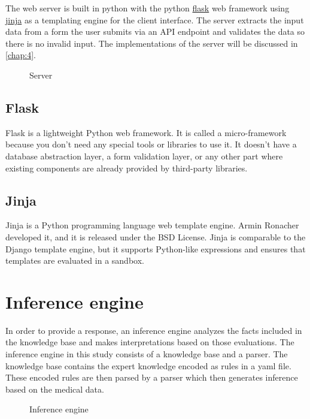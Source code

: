 The web server is built in python with the python \href{https://flask.palletsprojects.com/en/2.1.x/}{flask} web framework using \href{https://jinja.palletsprojects.com/en/3.1.x/}{jinja} as a templating engine for the client interface. The server extracts the input data from a form the user submits via an API endpoint and validates the data so there is no invalid input. The implementations of the server will be discussed in \autoref{chap:4}.

\begin{figure}[htb]
	\centering
	\caption{Server}
	\label{fig:server}
\end{figure}

\subsection{Flask}
Flask is a lightweight Python web framework. It is called a micro-framework because you don't need any special tools or libraries to use it. It doesn't have a database abstraction layer, a form validation layer, or any other part where existing components are already provided by third-party libraries.
\subsection{Jinja}
Jinja is a Python programming language web template engine. Armin Ronacher developed it, and it is released under the BSD License. Jinja is comparable to the Django template engine, but it supports Python-like expressions and ensures that templates are evaluated in a sandbox.

\section{Inference engine}
In order to provide a response, an inference engine analyzes the facts included in the knowledge base and makes interpretations based on those evaluations. The inference engine in this study consists of a knowledge base and a parser. The knowledge base contains the expert knowledge encoded as rules in a yaml file. These encoded rules are then parsed by a parser which then generates inference based on the medical data.

\begin{figure}[htb]
	\centering
	\caption{Inference engine}
	\label{fig:inference-engine}
\end{figure}
